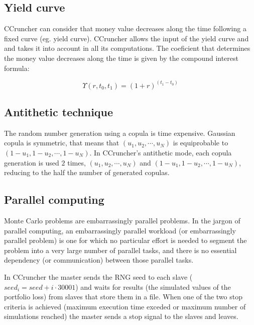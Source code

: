\documentclass[a4paper,12pt,final]{article}
\begin{document}
\subsection{Yield curve}
CCruncher can consider that money value decreases along the time following a fixed 
curve (eg. yield curve). CCruncher allows the input of the yield curve and and takes
it into account in all its computations. The coeficient that determines the money 
value decreases along the time is given by the compound interest formula:

\begin{displaymath}
\Upsilon(r, t_0,t_1) = (1+r)^{(t_1-t_0)}
\end{displaymath}

\subsection{Antithetic technique}
The random number generation using a copula is time expensive. Gaussian copula
is symmetric, that means that $(u_1, u_2, \cdots, u_N)$ is equiprobable to
$(1-u_1, 1-u_2, \cdots, 1-u_N)$. In CCruncher's antithetic mode, each copula 
generation is used $2$ times, $(u_1, u_2, \cdots, u_N)$ and 
$(1-u_1, 1-u_2, \cdots, 1-u_N)$, reducing to the half the number of generated
copulas.

\subsection{Parallel computing}
Monte Carlo problems are embarrassingly parallel problems.
In the jargon of parallel computing, an embarrassingly parallel workload 
(or embarrassingly parallel problem) is one for which no particular effort 
is needed to segment the problem into a very large number of parallel tasks, 
and there is no essential dependency (or communication) between those parallel 
tasks.
\newline

In CCruncher the master sends the RNG seed to each slave 
($seed_i = seed + i \cdot 30001$) and waits for results (the simulated values of
the portfolio loss) from slaves that store them in a file. When one of the two stop 
criteria is achieved (maximum execution time exceded or maximum number of 
simulations reached) the master sends a stop signal to the slaves and leaves.
\end{document}
